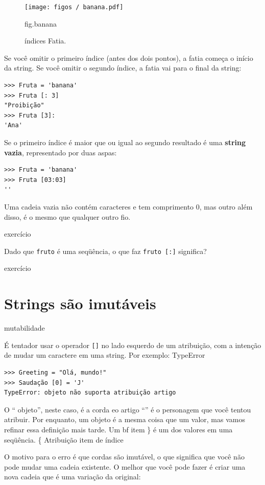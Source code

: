 \documentclass[10pt]{book}
\begin{document}
\begin{figure}
\centerline
{\texttt{[image: figos / banana.pdf]}}
\caption{índices Fatia.}
\label{} fig.banana
\end{figure}


Se você omitir o primeiro índice (antes dos dois pontos), a fatia começa
o início da string. Se você omitir o segundo índice, a fatia
vai para o final da string:

\begin{verbatim}
>>> Fruta = 'banana'
>>> Fruta [: 3]
"Proibição"
>>> Fruta [3]:
'Ana'
\end{verbatim}
%
Se o primeiro índice é maior que ou igual ao segundo resultado
é uma {\bf string vazia}, representado por duas aspas:

\begin{verbatim}
>>> Fruta = 'banana'
>>> Fruta [03:03]
''
\end{verbatim}
%
Uma cadeia vazia não contém caracteres e tem comprimento 0, mas outro
além disso, é o mesmo que qualquer outro fio.

\begin{} exercício

Dado que {\tt fruto} é uma seqüência, o que faz
{\tt fruto [:]} significa?

\end{} exercício


\section{Strings são imutáveis}
\index{} mutabilidade

É tentador usar o operador {\tt []} no lado esquerdo de um
atribuição, com a intenção de mudar um caractere em uma string.
Por exemplo:
\index{} TypeError

\begin{verbatim}
>>> Greeting = "Olá, mundo!"
>>> Saudação [0] = 'J'
TypeError: objeto não suporta atribuição artigo
\end{verbatim}
%
O `` objeto'', neste caso, é a corda eo artigo ``'' é
o personagem que você tentou atribuir. Por enquanto, um objeto {\bf} é
a mesma coisa que um valor, mas vamos refinar essa definição
mais tarde. Um {bf item \} é um dos valores em uma seqüência.
\{} Atribuição item de índice

O motivo para o erro é que
cordas são {\bf} imutável, o que significa que você não pode mudar uma
cadeia existente. O melhor que você pode fazer é criar uma nova cadeia
que é uma variação da original:
\end{document}
